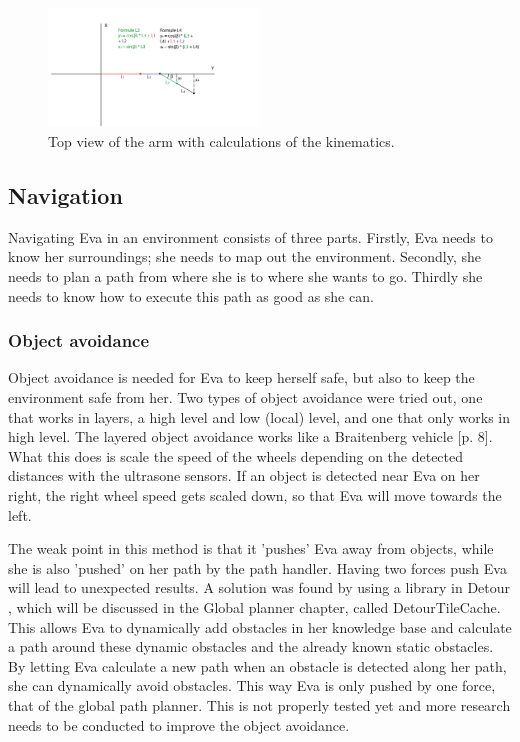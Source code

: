 \documentclass[project_eva.tex]{subfiles}
\begin{document}
\begin{figure}[h!]
	\centering
	\mbox{\includegraphics[width=0.5\textwidth]{Images/2d_bovenaanzicht.png}}
	\caption{Top view of the arm with calculations of the kinematics.}
	\label{fig:IK1}
\end{figure}

\subsection*{Navigation}
Navigating Eva in an environment consists of three parts. Firstly, Eva needs to know her surroundings; she needs to map out the environment. Secondly, she needs to plan a path from where she is to where she wants to go. Thirdly she needs to know how to execute this path as good as she can.

\subsubsection*{Object avoidance}
Object avoidance is needed for Eva to keep herself safe, but also to keep the environment safe from her. Two types of object avoidance were tried out, one that works in layers, a high level and low (local) level, and one that only works in high level. The layered object avoidance works like a Braitenberg vehicle \cite{braitenberg} [p. 8]. What this does is scale the speed of the wheels depending on the detected distances with the ultrasone sensors. If an object is detected near Eva on her right, the right wheel speed gets scaled down, so that Eva will move towards the left.

The weak point in this method is that it 'pushes' Eva away from objects, while she is also 'pushed' on her path by the path handler. Having two forces push Eva will lead to unexpected results. A solution was found by using a library in Detour \pageref{Global}, which will be discussed in the Global planner chapter, called DetourTileCache. This allows Eva to dynamically add obstacles in her knowledge base and calculate a path around these dynamic obstacles and the already known static obstacles. By letting Eva calculate a new path when an obstacle is detected along her path, she can dynamically avoid obstacles. This way Eva is only pushed by one force, that of the global path planner. This is not properly tested yet and more research needs to be conducted to improve the object avoidance.
\end{document}
